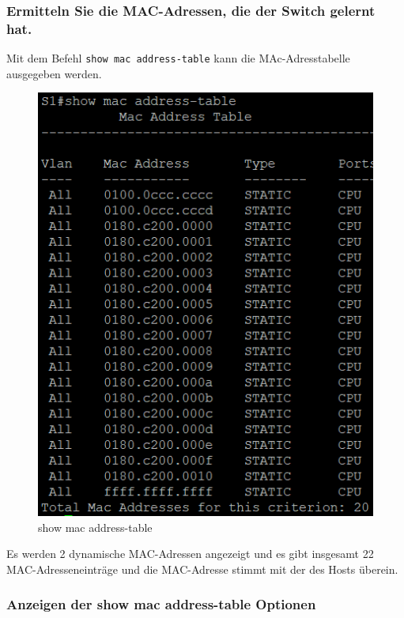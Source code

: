 \documentclass[a4paper]{article}
\newcommand{\abc}{\hfill \break}
\begin{document}
\newpage
\subsubsection{Ermitteln Sie die MAC-Adressen, die der Switch gelernt hat.}
Mit dem Befehl \texttt{show mac address-table} kann die MAc-Adresstabelle ausgegeben werden.\abc
\begin{figure}[h]
	\centering
	\includegraphics[scale=0.4]{images/show-mac-addr-table.png}
	\caption{show mac address-table}
\end{figure}\abc
Es werden 2 dynamische MAC-Adressen angezeigt und es gibt insgesamt 22 MAC-Adresseneinträge und die MAC-Adresse stimmt mit der des Hosts überein. \abc
\subsubsection{Anzeigen der show mac address-table Optionen}
\end{document}
